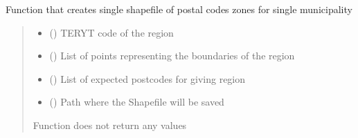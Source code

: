 \documentclass[letterpaper,10pt,english]{sphinxmanual}
\begin{document}

\begin{fulllineitems}
\label{\detokenize{pcm_utilities:pcm_utilities.sngl_pc_zone_shp}}
\pysigstartsignatures
{}
\pysigstopsignatures
\sphinxAtStartPar
Function that creates single shapefile of postal codes zones for single municipality
\begin{quote}\begin{description}
\begin{itemize}
\item {} 
\sphinxAtStartPar
{} () \textendash{} TERYT code of the region

\item {} 
\sphinxAtStartPar
{} (\sphinxcode{\sphinxupquote{List}}{[}\sphinxcode{\sphinxupquote{Any}}{]}) \textendash{} List of points representing the boundaries of the region

\item {} 
\sphinxAtStartPar
{} (\sphinxcode{\sphinxupquote{List}}{[}\sphinxcode{\sphinxupquote{str}}{]}) \textendash{} List of expected postcodes for giving region

\item {} 
\sphinxAtStartPar
{} () \textendash{} Path where the Shapefile will be saved

\end{itemize}

\sphinxAtStartPar
{}

\sphinxAtStartPar
Function does not return any values

\end{description}\end{quote}

\end{fulllineitems}

\end{document}
